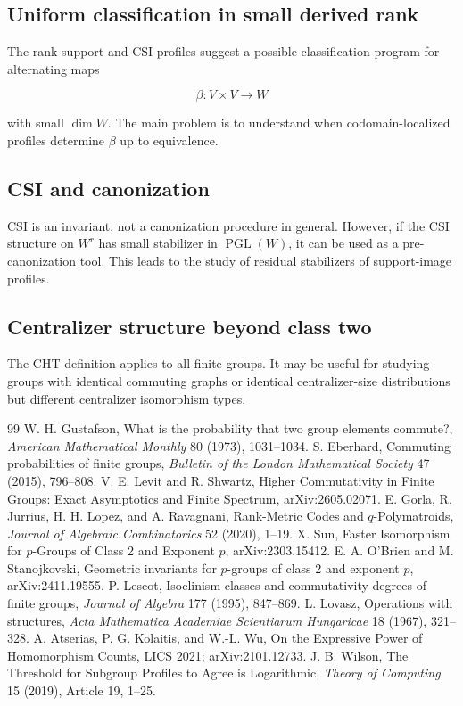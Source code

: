 \documentclass[11pt]{article}
\begin{document}
\subsection{Uniform classification in small derived rank}

The rank-support and CSI profiles suggest a possible classification program for alternating maps

\[
\beta:V\times V\to W
\]

with small $\dim W$. The main problem is to understand when codomain-localized profiles determine $\beta$ up to equivalence.

\subsection{CSI and canonization}

CSI is an invariant, not a canonization procedure in general. However, if the CSI structure on $W^r$ has small stabilizer in $\operatorname{PGL}(W)$, it can be used as a pre-canonization tool. This leads to the study of residual stabilizers of support-image profiles.

\subsection{Centralizer structure beyond class two}

The CHT definition applies to all finite groups. It may be useful for studying groups with identical commuting graphs or identical centralizer-size distributions but different centralizer isomorphism types.

\begin{thebibliography}{99}
 W. H. Gustafson, What is the probability that two group elements commute?, \emph{American Mathematical Monthly} 80 (1973), 1031--1034.
 S. Eberhard, Commuting probabilities of finite groups, \emph{Bulletin of the London Mathematical Society} 47 (2015), 796--808.
 V. E. Levit and R. Shwartz, Higher Commutativity in Finite Groups: Exact Asymptotics and Finite Spectrum, arXiv:2605.02071.
 E. Gorla, R. Jurrius, H. H. Lopez, and A. Ravagnani, Rank-Metric Codes and $q$-Polymatroids, \emph{Journal of Algebraic Combinatorics} 52 (2020), 1--19.
 X. Sun, Faster Isomorphism for $p$-Groups of Class 2 and Exponent $p$, arXiv:2303.15412.
 E. A. O'Brien and M. Stanojkovski, Geometric invariants for $p$-groups of class 2 and exponent $p$, arXiv:2411.19555.
 P. Lescot, Isoclinism classes and commutativity degrees of finite groups, \emph{Journal of Algebra} 177 (1995), 847--869.
 L. Lovasz, Operations with structures, \emph{Acta Mathematica Academiae Scientiarum Hungaricae} 18 (1967), 321--328.
 A. Atserias, P. G. Kolaitis, and W.-L. Wu, On the Expressive Power of Homomorphism Counts, LICS 2021; arXiv:2101.12733.
 J. B. Wilson, The Threshold for Subgroup Profiles to Agree is Logarithmic, \emph{Theory of Computing} 15 (2019), Article 19, 1--25.
\end{thebibliography}
\end{document}
